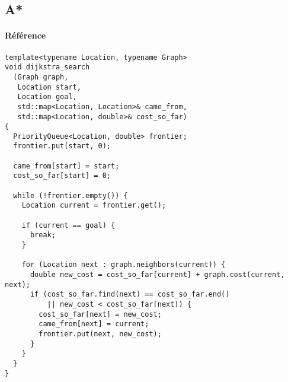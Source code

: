 \newpage
\subsection{A*}
\paragraph{Référence} \cite{Algorithm5}
\begin{lstlisting}
template<typename Location, typename Graph>
void dijkstra_search
  (Graph graph,
   Location start,
   Location goal,
   std::map<Location, Location>& came_from,
   std::map<Location, double>& cost_so_far)
{
  PriorityQueue<Location, double> frontier;
  frontier.put(start, 0);

  came_from[start] = start;
  cost_so_far[start] = 0;
  
  while (!frontier.empty()) {
    Location current = frontier.get();

    if (current == goal) {
      break;
    }

    for (Location next : graph.neighbors(current)) {
      double new_cost = cost_so_far[current] + graph.cost(current, next);
      if (cost_so_far.find(next) == cost_so_far.end()
          || new_cost < cost_so_far[next]) {
        cost_so_far[next] = new_cost;
        came_from[next] = current;
        frontier.put(next, new_cost);
      }
    }
  }
}
\end{lstlisting}
